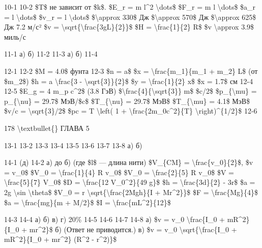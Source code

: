 \documentclass[10pt,oneside]{article}
\newcommand{\TipsSubsection}[1]{\par\vspace{6bp}{\normalsize\bfseries #1\par}\vspace{2bp}}
\begin{document}
\TipsSubsection{9-2 В любом месте 9-3 9-4 9-5 9-6 9-7 9-8 9-9 Спутник улетит по параболической орбите.}

10-1 10-2 \$T\$ не зависит от \$k\$. \$E\_r = m l\textasciicircum{}2 \textbackslash{}dots\$ \$F\_r = m l \textbackslash{}dots\$ \$a\_r = l \textbackslash{}dots\$ \$v\_r = l \textbackslash{}dots\$ \$\textbackslash{}approx 330\$ Дж \$\textbackslash{}approx 570\$ Дж \$\textbackslash{}approx 625\$ Дж 7.2 м/с² \$v = \textbackslash{}sqrt\{\textbackslash{}frac\{3gL\}\{2\}\}\$ \$H = \textbackslash{}frac\{1\}\{2\} R\$ \$v \textbackslash{}approx 3.9\$ миль/с\par

11-1 а) б) 11-2 11-3 а) б) 11-4\par

12-1 12-2 \$M = 4.0\$ фунта 12-3 \$n = a\$ \$x = \textbackslash{}frac\{m\_1\}\{m\_1 + m\_2\} L\$ (от \$m\_2\$) \$h = a \textbackslash{}frac\{3 - \textbackslash{}sqrt\{3\}\}\{2\}\$ \$y = \textbackslash{}frac\{1\}\{2\} x\$ \$x = 1.7\$ см 12-4 12-5 \$E\_g = 4 m\_p c\textasciicircum{}2\$ (3.8 ГэВ) \$\textbackslash{}frac\{4\}\{\textbackslash{}sqrt\{3\}\} m\$ \$c/2\$ \$p\_\{\textbackslash{}mu\} = p\_\{\textbackslash{}nu\} = 29.7\$ МэВ/\$c\$ \$T\_\{\textbackslash{}nu\} = 29.7\$ МэВ\$ \$T\_\{\textbackslash{}mu\} = 4.1\$ МэВ\$ \$v/c = \textbackslash{}sqrt\{3\}/2\$ \$pc = T \textbackslash{}left( 1 + \textbackslash{}frac\{2m\_0c\textasciicircum{}2\}\{T\} \textbackslash{}right)\textasciicircum{}\{1/2\}\$ 12-6\par

178 \textbackslash{}textbullet\{\} ГЛАВА 5\par

13-1 13-2 13-3 13-4 13-5 13-6 13-7 13-8 а) б)\par

14-1 (д) 14-2 а) до б) (где \$l\$ --- длина нити) \$V\_\{CM\} = \textbackslash{}frac\{v\_0\}\{2\}\$, \$v = v\_0\$ \$V\_0 = \textbackslash{}frac\{1\}\{4\} R v\_0\$ \$V\_0 = \textbackslash{}frac\{2\}\{5\} R v\_0\$ \$V = \textbackslash{}frac\{5\}\{7\} V\_0\$ \$D = \textbackslash{}frac\{12 V\_0\textasciicircum{}2\}\{49 g\}\$ \$h = \textbackslash{}frac\{3d\}\{2\} - 3r\$ \$a = 2g \textbackslash{}sin \textbackslash{}theta\$ \$V\_0 = r \textbackslash{}sqrt\{\textbackslash{}frac\{2Mgh\}\{I + Mr\textasciicircum{}2\}\}\$ \$F = \textbackslash{}frac\{Mg\}\{4\}\$ \$a = \textbackslash{}frac\{mg\}\{m + M/2\}\$ \$I = \textbackslash{}frac\{mL\textasciicircum{}2\}\{12\}\$\par

14-3 14-4 а) б) в) г) 20\% 14-5 14-6 14-7 14-8 а) \$v = v\_0 \textbackslash{}frac\{I\_0 + mR\textasciicircum{}2\}\{I\_0 + mr\textasciicircum{}2\}\$ б) (Ответ не приводится.) в) \$v = v\_0 \textbackslash{}sqrt\{\textbackslash{}frac\{I\_0 + mR\textasciicircum{}2\}\{I\_0 + mr\textasciicircum{}2\} (R\textasciicircum{}2 - r\textasciicircum{}2)\}\$\par
\end{document}
